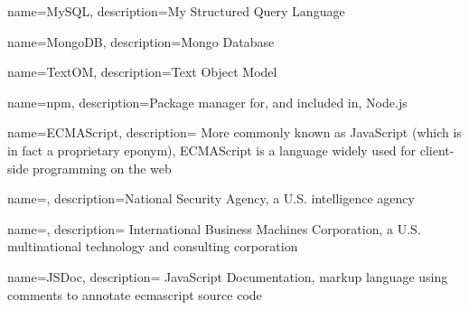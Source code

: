

{
  name=MySQL,
  description={My Structured Query Language}
}

{
  name=MongoDB,
  description={Mongo Database}
}

{
  name=TextOM,
  description={Text Object Model}
}

{
  name=npm,
  description={Package manager for, and included in, Node.js}
}

{
  name={ECMAScript},
  description={
    More commonly known as JavaScript (which is in fact a proprietary
    eponym), ECMAScript is a language widely used for
    client-side programming on the web}
}

{
  name=,
  description={National Security Agency, a U.S. intelligence agency}
}

{
  name=,
  description={
    International Business Machines Corporation, a U.S. multinational
    technology and consulting corporation}
}

{
  name={JSDoc},
  description={
    JavaScript Documentation, markup language using comments to annotate
    \gls{ecmascript} source code}
}
